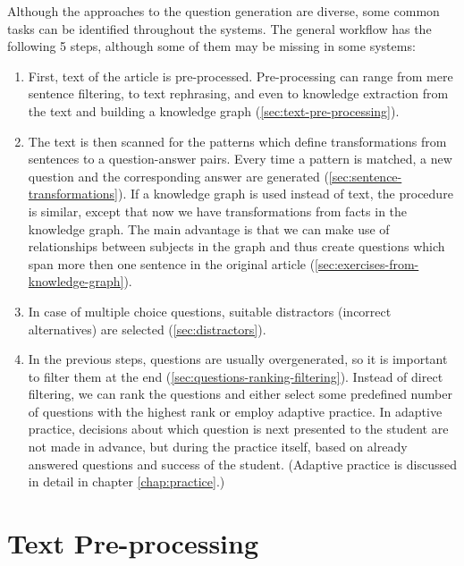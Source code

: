 \documentclass[12pt, twoside]{fithesis2}
\renewcommand{\_}{\leavevmode \kern0.07em\vbox{\hrule width0.4em}}
\newenvironment{myEnumerate}{
  \begin{enumerate}[leftmargin=2em,rightmargin=1em,itemsep=\parskip ,parsep=0em,topsep=0em,partopsep=0em]
}{
  \end{enumerate}
}
\newcounter{choice}
\begin{document}
Although the approaches to the question generation are diverse,
some common tasks can be identified throughout the systems.
The general workflow has the following 5 steps, although some of them may be missing in some systems:
\begin{myEnumerate}
\item First, text of the article is pre-processed.
Pre-processing can range from mere sentence filtering,
to text rephrasing, and even to knowledge extraction from the text and building a knowledge graph
(\autoref{sec:text-pre-processing}).

\item The text is then scanned for the patterns which define transformations from sentences to a question-answer pairs.
  Every time a pattern is matched, a new question and the corresponding answer are generated
  (\autoref{sec:sentence-transformations}).
  If a knowledge graph is used instead of text, the procedure is similar, except that now we have transformations from facts in the knowledge graph. The main advantage is that we can make use of relationships between subjects in the graph and thus create questions which span more then one sentence in the original article
  (\autoref{sec:exercises-from-knowledge-graph}).

\item In case of multiple choice questions, suitable distractors (incorrect alternatives) are selected
(\autoref{sec:distractors}).

\item In the previous steps, questions are usually overgenerated, so it is important to filter them at the end
  (\autoref{sec:questions-ranking-filtering}).
  Instead of direct filtering, we can rank the questions and either select some predefined number of questions with the highest rank
  or employ adaptive practice.
In adaptive practice, decisions about which question is next presented to the student
are not made in advance, but during the practice itself,
based on already answered questions and success of the student.
(Adaptive practice is discussed in detail in chapter \autoref{chap:practice}.)
\end{myEnumerate}

\section{Text Pre-processing}
\label{sec:text-pre-processing}
\end{document}

